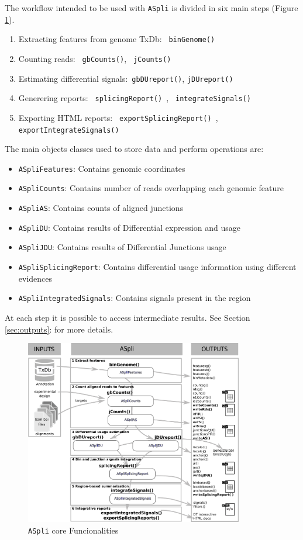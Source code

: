 \documentclass{article}
\begin{document}
The workflow intended to be used with \texttt{ASpli} is divided in six main steps (Figure \ref{fig:ASpliStructure}). 
\begin{enumerate}
  \item Extracting features from genome TxDb: \texttt{ binGenome() }
  \item Counting reads:  \texttt{ gbCounts()},  \texttt{ jCounts()}
  \item Estimating differential signals:\texttt{ gbDUreport()}, 
  \texttt{jDUreport()}
  \item Generering reports: \texttt{ splicingReport() }, \texttt{ integrateSignals() }
  \item Exporting HTML reports: \texttt{ exportSplicingReport() }, \texttt{ exportIntegrateSignals() }
\end{enumerate}

The main objects classes used to store data and perform operations are:
\begin{itemize}
  \item \texttt{ASpliFeatures}: Contains genomic coordinates
  \item \texttt{ASpliCounts}: Contains number of reads overlapping each genomic feature
  \item \texttt{ASpliAS}: Contains counts of aligned junctions   
  \item \texttt{ASpliDU}: Contains results of Differential expression and usage
  \item \texttt{ASpliJDU}: Contains results of Differential Junctions usage
  \item \texttt{ASpliSplicingReport}: Contains differential usage information using different evidences
  \item \texttt{ASpliIntegratedSignals}: Contains signals present in the region
  \end{itemize}
  
At each step it is possible to access intermediate results. 
See Section \ref{sec:outputs}: for more details.

\begin{figure}[ht!]
\centering
\includegraphics[width=0.85\textwidth]{images/workflow_ok.pdf}
\caption{ \texttt{ASpli} core Funcionalities }
\label{fig:ASpliStructure}
\end{figure}
\end{document}
